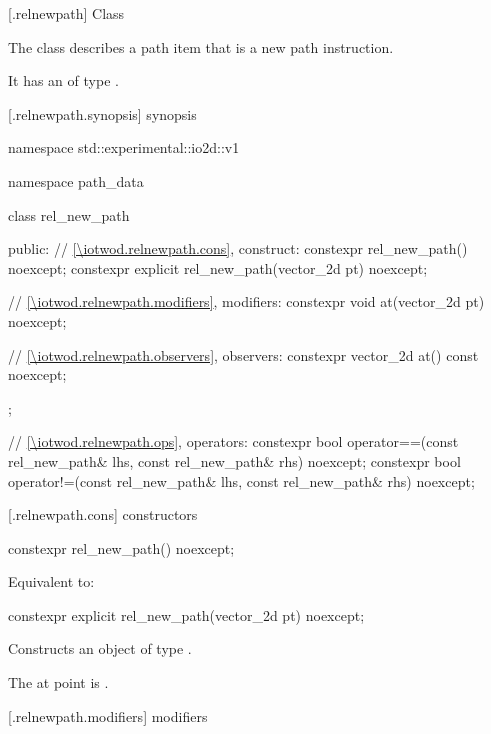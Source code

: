 [\iotwod.relnewpath] {Class }%

\pnum
{}%
The class  describes a path item that is a new path instruction.

\pnum
It has an  of type .

 [\iotwod.relnewpath.synopsis] { synopsis}%

\begin{codeblock}
namespace std::experimental::io2d::v1 {
  namespace path_data {
    class rel_new_path {
    public:
      // \ref{\iotwod.relnewpath.cons}, construct:
      constexpr rel_new_path() noexcept;
      constexpr explicit rel_new_path(vector_2d pt) noexcept;

      // \ref{\iotwod.relnewpath.modifiers}, modifiers:
      constexpr void at(vector_2d pt) noexcept;

      // \ref{\iotwod.relnewpath.observers}, observers:
      constexpr vector_2d at() const noexcept;
    };
    
  // \ref{\iotwod.relnewpath.ops}, operators:
  constexpr bool operator==(const rel_new_path& lhs, const rel_new_path& rhs) 
    noexcept;
  constexpr bool operator!=(const rel_new_path& lhs, const rel_new_path& rhs) 
    noexcept;
  }
}
\end{codeblock}

 [\iotwod.relnewpath.cons] { constructors}%

%
\begin{itemdecl}
constexpr rel_new_path() noexcept;
\end{itemdecl}
\begin{itemdescr}
\pnum
\effects
Equivalent to: 
\end{itemdescr}

%
\begin{itemdecl}
constexpr explicit rel_new_path(vector_2d pt) noexcept;
\end{itemdecl}
\begin{itemdescr}
\pnum
\effects
Constructs an object of type .

\pnum
The at point is .
\end{itemdescr}

 [\iotwod.relnewpath.modifiers]{ modifiers}%

